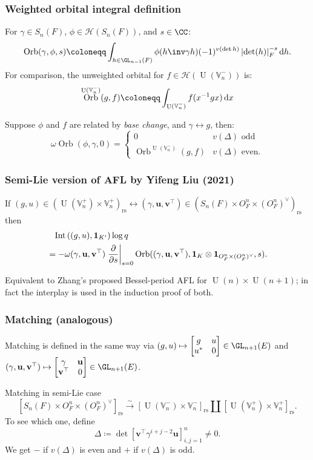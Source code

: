 \documentclass[11pt]{beamer}
\DeclareMathOperator{\Int}{Int}
\DeclareMathOperator{\Orb}{Orb}
\DeclareMathOperator{\U}{U}
\newcommand{\HH}{\mathcal{H}}
\newcommand{\VV}{\mathbb{V}}
\renewcommand{\OO}{O}
\newcommand{\guv}{{(\gamma, \uu, \vv^\top)}}
\newcommand{\rs}{_{\text{rs}}}
\newcommand{\uu}{\mathbf{u}}
\newcommand{\vv}{\mathbf{v}}
\newcommand{\oneV}{\mathbf{1}_{\OO_F^n \times (\OO_F^n)^\vee}}
\begin{document}
\begin{frame}
  \frametitle{Weighted orbital integral definition}
  For $\gamma \in S_n(F)$, $\phi \in \HH(S_n(F))$, and $s \in \CC$:
  \[ \Orb(\gamma, \phi, s) \coloneqq
    \int_{h \in \GL_{n-1}(F)} \phi(h\inv \gamma h) (-1)^{v(\det h)}
    \left\lvert \det(h) \right\rvert_F^{-s} \odif h. \]
  For comparison, the unweighted orbital for $f \in \HH(\U(\VV_n^-))$ is:
  \[ \Orb^{\U(\VV_n^-)}(g, f) \coloneqq \int_{\U(\VV_n^-)} f(x^{-1}gx) \odif x \]
  \begin{theorem}
    Suppose $\phi$ and $f$ are related by \emph{base change}, and $\gamma \longleftrightarrow g$, then:
    \[
      \omega \Orb(\phi, \gamma, 0)
      = \begin{cases}
        0 & v(\Delta) \text{ odd} \\
        \Orb^{\U(\VV_n^-)}(g, f) & v(\Delta) \text{ even}.
      \end{cases}
    \]
  \end{theorem}
\end{frame}

\begin{frame}
  \frametitle{Semi-Lie version of AFL by Yifeng Liu (2021)}
  \begin{theorem}
    If $(g, u) \in (\U(\VV_n^+) \times \VV_n^+)\rs \longleftrightarrow
      (\gamma, \uu, \vv^\top) \in (S_n(F) \times \OO_F^n \times (\OO_F^n)^\vee)\rs$
    then
    \begin{align*}
      &\phantom= \Int\left( (g,u), \mathbf{1}_{K'} \right) \log q \\
      &= -\omega\guv \left. \pdv{}{s} \right\rvert_{s=0}
      \Orb(\guv, \mathbf{1}_K \otimes \oneV, s).
    \end{align*}
  \end{theorem}
  Equivalent to Zhang's proposed Bessel-period AFL for $\U(n) \times \U(n+1)$;
  in fact the interplay is used in the induction proof of both.
\end{frame}

\begin{frame}
  \frametitle{Matching (analogous)}
  Matching is defined in the same way via
  $(g,u) \mapsto \begin{bmatrix} g & u \\ u^\ast & 0 \end{bmatrix} \in \GL_{n+1}(E)$
  and $\guv \mapsto \begin{bmatrix} \gamma & \uu \\ \vv^\top & 0 \end{bmatrix} \in \GL_{n+1}(E)$.

  \begin{block}{Matching in semi-Lie case}
  \[ [S_n(F) \times \OO_F^n \times (\OO_F^n)^\vee]\rs \xrightarrow{\sim} [\U(\VV_n^-) \times \VV_n^-]\rs \amalg [\U(\VV_n^+) \times \VV_n^+]\rs. \]
  To see which one, define
  \[ \Delta \coloneqq \det \left[ \vv^\top \gamma^{i+j-2} \uu \right]_{i,j=1}^n \neq 0. \]
  We get $-$ if $v(\Delta)$ is even
  and $+$ if $v(\Delta)$ is odd.
  \end{block}
\end{frame}
\end{document}
